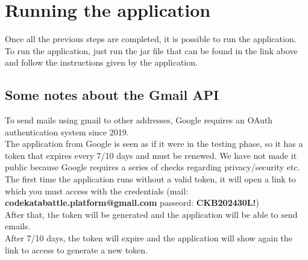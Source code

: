 \section{Running the application}
Once all the previous steps are completed, it is possible to run the application.\\
To run the application, just run the jar file that can be found in the link above and follow the instructions given by the application.

\subsection{Some notes about the Gmail API}

To send mails using gmail to other addresses, Google requires an OAuth authentication system since 2019.\\
The application from Google is seen as if it were in the testing phase, so it has a token that expires every 7/10 days and must be renewed. We have not made it public because Google requires a series of checks regarding privacy/security etc.\\

The first time the application runs without a valid token, it will open a link to which you must access with the credentials (mail: \textbf{codekatabattle.platform@gmail.com} passeord: \textbf{CKB202430L!})\\
After that, the token will be generated and the application will be able to send emails.\\
After 7/10 days, the token will expire and the application will show again the link to access to generate a new token.\\